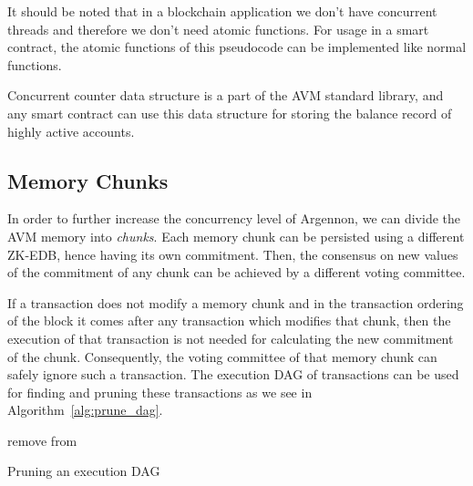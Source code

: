 \documentclass[11pt, a4paper]{report}
\begin{document}
    It should be noted that in a blockchain application we don't have concurrent threads and therefore we don't need
    atomic functions. For usage in a smart contract, the atomic functions of this pseudocode can be implemented like
    normal functions.

    Concurrent counter data structure is a part of the AVM standard library, and any smart contract can use this data
    structure for storing the balance record of highly active accounts.

    \subsection{Memory Chunks}\label{subsec:memory-chunks}

    In order to further increase the concurrency level of Argennon, we can divide the AVM memory into \emph{chunks}.
    Each memory chunk can be persisted using a different ZK-EDB, hence having its own commitment. Then, the
    consensus on new values of the commitment of any chunk can be achieved by a different voting committee.

    If a transaction does not modify a memory chunk and in the transaction ordering of the block it comes after
    any transaction which modifies that chunk, then the execution of that transaction is not needed for calculating
    the new commitment of the chunk. Consequently, the voting committee of that memory chunk can safely ignore such a
    transaction. The execution DAG of transactions can be used for finding and pruning these transactions as
    we see in Algorithm~\ref{alg:prune_dag}.

    \begin{algorithm}
        \DontPrintSemicolon
        \BlankLine
        {
            \RPrune{\V}\;
        }
        \BlankLine
        \Fn{\RPrune{\V}}
        {
            {
                remove \V from \Graph\;
                {
                    \;
                }
            }
        }
        \caption{Pruning an execution DAG}\label{alg:prune_dag}
    \end{algorithm}
\end{document}
